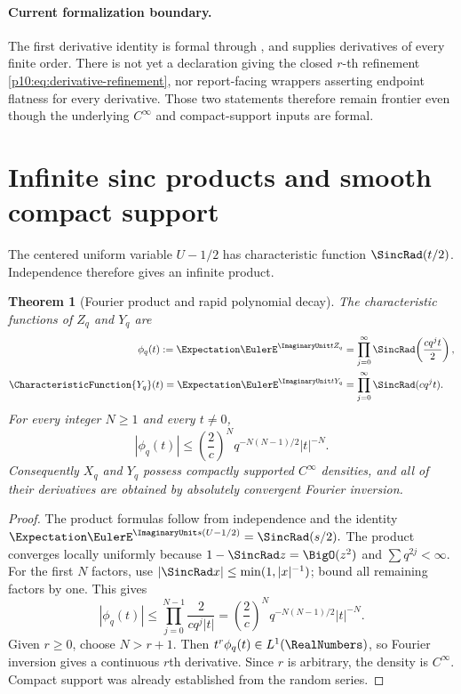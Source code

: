 \documentclass[11pt]{article}
\numberwithin{equation}{section}
\newtheorem{theorem}{Theorem}[section]
\theoremstyle{definition}
\theoremstyle{remark}
\begin{document}
\paragraph{Current formalization boundary.}
The first derivative identity is formal through
, and
 supplies derivatives of every finite order.
There is not yet a declaration giving the closed \(r\)-th refinement
\eqref{p10:eq:derivative-refinement}, nor report-facing wrappers asserting endpoint
flatness for every derivative.  Those two statements therefore remain frontier even though
the underlying \(C^\infty\) and compact-support inputs are formal.

\section{Infinite sinc products and smooth compact support}
\label{p10:sec:fourier}

The centered uniform variable $U-1/2$ has characteristic function
$\SincRad(t/2)$.  Independence therefore gives an infinite product.

\begin{theorem}[Fourier product and rapid polynomial decay]
\label{p10:thm:smoothness}
The characteristic functions of $Z_q$ and $Y_q$ are
\begin{align}
 \phi_q(t):=\Expectation\EulerE^{\ImaginaryUnit tZ_q}
 &=\prod_{j=0}^{\infty}\SincRad\!\left(\frac{cq^jt}{2}\right),  \label{p10:eq:phi-z}\\
 \CharacteristicFunction{Y_q}(t)=\Expectation\EulerE^{\ImaginaryUnit tY_q}
 &=\prod_{j=0}^{\infty}\SincRad(cq^jt).                         \label{p10:eq:phi-y}
\end{align}
For every integer $N\ge1$ and every $t\ne0$,
\begin{equation}
 |\phi_q(t)|
 \le \left(\frac{2}{c}\right)^N q^{-N(N-1)/2}|t|^{-N}.      \label{p10:eq:rapid-bound}
\end{equation}
Consequently $X_q$ and $Y_q$ possess compactly supported $C^\infty$ densities, and all
of their derivatives are obtained by absolutely convergent Fourier inversion.
\end{theorem}

\begin{proof}
The product formulas follow from independence and the identity
\(
 \Expectation\EulerE^{\ImaginaryUnit s(U-1/2)}=\SincRad(s/2).
\)
The product converges locally uniformly because
$1-\SincRad z=\BigO(z^2)$ and $\sum q^{2j}<\infty$.
For the first $N$ factors, use $|\SincRad x|\le\min(1,|x|^{-1})$; bound all remaining factors by
one.  This gives
\[
 |\phi_q(t)|
 \le\prod_{j=0}^{N-1}\frac{2}{cq^j|t|}
 =\left(\frac{2}{c}\right)^Nq^{-N(N-1)/2}|t|^{-N}.
\]
Given $r\ge0$, choose $N>r+1$.  Then $t^r\phi_q(t)\in L^1(\RealNumbers)$, so Fourier inversion gives a
continuous $r$th derivative.  Since $r$ is arbitrary, the density is $C^\infty$.  Compact
support was already established from the random series.
\end{proof}
\end{document}
